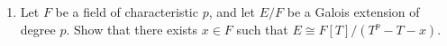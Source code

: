 \documentclass[10pt]{article}
\begin{document}
\begin{itemize}
\begin{enumerate}
\item Let $F$ be a field of characteristic $p$, and let $E/F$ be a Galois extension of degree $p$. Show that there exists $x\in F$ such that $E\cong F[T]/(T^p-T-x)$.
\end{enumerate}


\end{itemize}
\end{document}

